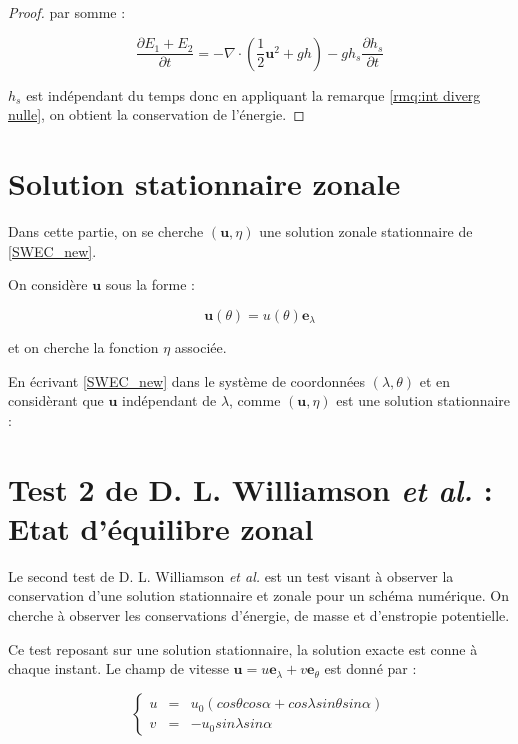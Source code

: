 \begin{proof}
par somme :

$$
\dfrac{\partial E_1 + E_2}{\partial t} = - \nabla \cdot \left( \dfrac{1}{2} \mathbf{u}^2 + gh \right) - g h_s \dfrac{\partial h_s}{\partial t} 
$$

$h_s$ est indépendant du temps donc en appliquant la remarque \ref{rmq:int diverg nulle}, on obtient la conservation de l'énergie.
\end{proof}

\section{Solution stationnaire zonale}

Dans cette partie, on se cherche $(\mathbf{u}, \eta)$ une solution zonale stationnaire de \eqref{SWEC_new}.

On considère $\mathbf{u}$ sous la forme :

\begin{equation}
\mathbf{u}(\theta) = u(\theta) \mathbf{e}_{\lambda}
\end{equation}

et on cherche la fonction $\eta$ associée.

En écrivant \eqref{SWEC_new} dans le système de coordonnées $(\lambda, \theta)$ et en considèrant que $\mathbf{u}$ indépendant de $\lambda$, comme $(\mathbf{u}, \eta)$ est une solution stationnaire :



\section{Test 2 de D. L. Williamson \textit{et al.} : Etat d'équilibre zonal}

Le second test de D. L. Williamson \textit{et al.} \cite{Williamson1992} est un test visant à observer la conservation d'une solution stationnaire et zonale pour un schéma numérique. On cherche à observer les conservations d'énergie, de masse et d'enstropie potentielle.

Ce test reposant sur une solution stationnaire, la solution exacte est conne à chaque instant. Le champ de vitesse $\mathbf{u} = u \mathbf{e}_{\lambda} + v \mathbf{e}_{\theta}$ est donné par :

\begin{equation}
\left\lbrace
\begin{array}{rcl}
u & = & u_0 \left( cos \theta cos \alpha + cos \lambda sin \theta sin \alpha \right)\\
v & = & - u_0 sin \lambda sin \alpha
\end{array}
\right.
\label{eq:williamson2_u}
\end{equation}

